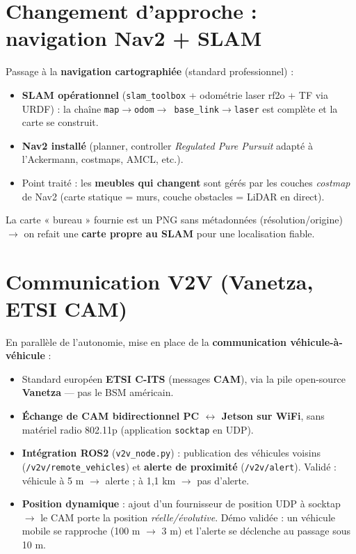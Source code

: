 \documentclass[a4paper,11pt]{article}
\begin{document}
\section{Changement d'approche : navigation Nav2 + SLAM}
Passage à la \textbf{navigation cartographiée} (standard professionnel) :
\begin{itemize}[leftmargin=1.4em, nosep]
  \item \textbf{SLAM opérationnel} (\texttt{slam\_toolbox} + odométrie laser rf2o
        + TF via URDF) : la chaîne \texttt{map$\rightarrow$odom$\rightarrow$
        base\_link$\rightarrow$laser} est complète et la carte se construit.
  \item \textbf{Nav2 installé} (planner, controller \emph{Regulated Pure Pursuit}
        adapté à l'Ackermann, costmaps, AMCL, etc.).
  \item Point traité : les \textbf{meubles qui changent} sont gérés par les
        couches \emph{costmap} de Nav2 (carte statique = murs, couche obstacles =
        LiDAR en direct).
\end{itemize}
\begin{tcolorbox}[colback=lightorange,colframe=warning,title=Point ouvert]
La carte « bureau » fournie est un PNG sans métadonnées (résolution/origine)
$\rightarrow$ on refait une \textbf{carte propre au SLAM} pour une localisation
fiable.
\end{tcolorbox}

\section{Communication V2V (Vanetza, ETSI CAM)}
En parallèle de l'autonomie, mise en place de la \textbf{communication
véhicule-à-véhicule} :
\begin{itemize}[leftmargin=1.4em, nosep]
  \item Standard européen \textbf{ETSI C-ITS} (messages \textbf{CAM}), via la pile
        open-source \textbf{Vanetza} --- pas le BSM américain.
  \item \textbf{Échange de CAM bidirectionnel PC $\leftrightarrow$ Jetson sur
        WiFi}, sans matériel radio 802.11p (application \texttt{socktap} en UDP).
  \item \textbf{Intégration ROS2} (\texttt{v2v\_node.py}) : publication des
        véhicules voisins (\texttt{/v2v/remote\_vehicles}) et \textbf{alerte de
        proximité} (\texttt{/v2v/alert}). Validé : véhicule à 5 m $\rightarrow$
        alerte ; à 1,1 km $\rightarrow$ pas d'alerte.
  \item \textbf{Position dynamique} : ajout d'un fournisseur de position UDP à
        socktap $\rightarrow$ le CAM porte la position \emph{réelle/évolutive}.
        Démo validée : un véhicule mobile se rapproche (100 m $\rightarrow$ 3 m) et
        l'alerte se déclenche au passage sous 10 m.
\end{itemize}
\end{document}
